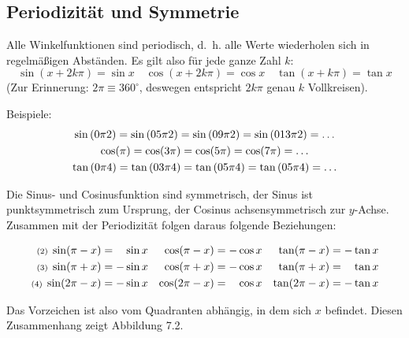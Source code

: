 \subsection{Periodizität und Symmetrie}\label{sec:trig:perioden}
Alle Winkelfunktionen sind periodisch, d.~h. alle Werte wiederholen sich in
regelmäßigen Abständen. Es gilt also für jede ganze Zahl $k$:
\[\sin(x+2k\pi) = \sin x \quad \cos(x+2k\pi) = \cos x \quad \tan(x+k\pi) =
\tan x\] (Zur Erinnerung: $2\pi \equiv 360^\circ$, deswegen entspricht $2k\pi$ genau $k$ Vollkreisen).

\newpar
Beispiele:
\begin{gather*}
\sin\left(\pitwo\right) = \sin\left(\frac{5\pi}{2} \right)=
\sin\left(\frac{9\pi}{2} \right)= \sin\left(\frac{13\pi}{2} \right) = \dots\\
\cos(\pi) = \cos(3\pi) = \cos(5\pi) = \cos(7\pi) = \dots\\
\tan\left(\frac{\pi}{4}\right) = \tan\left(\frac{3\pi}{4}\right) =
\tan\left(\frac{5\pi}{4}\right) = \tan\left(\frac{5\pi}{4}\right) = \dots
\end{gather*}

\newpar

\noindent Die Sinus- und Cosinusfunktion sind symmetrisch, der Sinus ist
punktsymmetrisch zum Ursprung, der Cosinus achsensymmetrisch zur $y$-Achse.
Zusammen mit der Periodizität folgen daraus folgende Beziehungen:

\begin{align*}
\text{\scriptsize(2) } \sin(\pi-x)&= \phantom{-}\sin x& \cos(\pi-x)&=-\cos x &
\tan(\pi-x)
&= -\tan x\\
\text{\scriptsize(3) }\sin(\pi+x)&= -\sin x & \cos(\pi+x)&=-\cos x &
\tan(\pi+x)
&= \phantom{-}\tan x\\
\text{\scriptsize(4) } \sin(2\pi-x)&= -\sin x& \cos(2\pi-x)&=\phantom{-}\cos x
& \tan(2\pi-x)
&= -\tan x\\
\end{align*}

\noindent Das Vorzeichen ist also vom Quadranten abhängig, in dem sich $x$ befindet.
Diesen Zusammenhang zeigt Abbildung 7.2.

